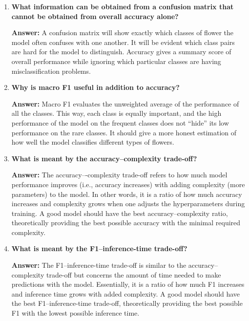 \documentclass[10pt]{article}
\begin{document}
\begin{enumerate}
\vspace{5mm}

\item \textbf{What information can be obtained from a confusion matrix that cannot
be obtained from overall accuracy alone?}

\textbf{Answer:} A confusion matrix will show exactly which classes of flower the model often confuses with one another. It will be evident which class pairs are hard for the model to distinguish. Accuracy gives a summary score of overall performance while ignoring which particular classes are having misclassification problems.

\vspace{5mm}

\item \textbf{Why is macro F1 useful in addition to accuracy?}

\textbf{Answer:} Macro F1 evaluates the unweighted average of the performance of all the classes. This way, each class is equally important, and the high performance of the model on the frequent classes does not “hide” its low performance on the rare classes. It should give a more honest estimation of how well the model classifies different types of flowers.

\vspace{5mm}

\item \textbf{What is meant by the accuracy--complexity trade-off?}

\textbf{Answer:} The accuracy–-complexity trade-off refers to how much model performance improves (i.e., accuracy increases) with adding complexity (more parameters) to the model. In other words, it is a ratio of how much accuracy increases and complexity grows when one adjusts the hyperparameters during training. A good model should have the best accuracy–complexity ratio, theoretically providing the best possible accuracy with the minimal required complexity.

\vspace{5mm}

\item \textbf{What is meant by the F1--inference-time trade-off?}

\textbf{Answer:} The F1–inference-time trade-off is similar to the accuracy–complexity trade-off but concerns the amount of time needed to make predictions with the model. Essentially, it is a ratio of how much F1 increases and inference time grows with added complexity. A good model should have the best F1–inference-time trade-off, theoretically providing the best possible F1 with the lowest possible inference time.


\end{enumerate}
\end{document}
